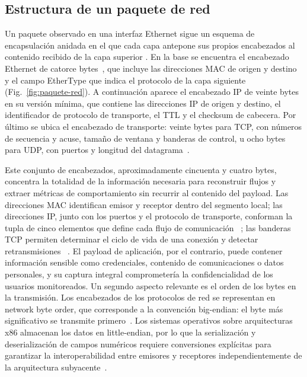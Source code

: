 \subsection{Estructura de un paquete de red
}

Un paquete observado en una interfaz Ethernet sigue un esquema de 
encapsulación anidada en el que cada capa antepone sus propios 
encabezados al contenido recibido de la capa superior 
\cite{forouzan2006transmision}. En la base se encuentra el encabezado 
Ethernet de catorce bytes~\cite{ieee8023}, que incluye las 
direcciones MAC de origen y destino y el campo EtherType que indica 
el protocolo de la capa siguiente (Fig.~\ref{fig:paquete-red}). A 
continuación aparece el encabezado IP de veinte bytes en su versión 
mínima, que contiene las direcciones IP de origen y destino, el 
identificador de protocolo de transporte, el TTL y el checksum de 
cabecera. Por último se ubica el encabezado de transporte: veinte 
bytes para TCP, con números de secuencia y acuse, tamaño de ventana 
y banderas de control, u ocho bytes para UDP, con puertos y longitud 
del datagrama~\cite{stevens2004unix}.

Este conjunto de encabezados, aproximadamente cincuenta y cuatro 
bytes, concentra la totalidad de la información necesaria para 
reconstruir flujos y extraer métricas de comportamiento sin recurrir 
al contenido del payload. Las direcciones MAC identifican emisor y 
receptor dentro del segmento local; las direcciones IP, junto con 
los puertos y el protocolo de transporte, conforman la tupla de 
cinco elementos que define cada flujo de comunicación 
~\cite{kurose2010redes}; las banderas TCP permiten determinar el 
ciclo de vida de una conexión y detectar retransmisiones 
~\cite{rfc793}. El payload de aplicación, por el contrario, puede 
contener información sensible como credenciales, contenido de 
comunicaciones o datos personales, y su captura integral 
comprometería la confidencialidad de los usuarios monitoreados.
Un segundo aspecto relevante es el orden de los bytes en la 
transmisión. Los encabezados de los protocolos de red se representan 
en network byte order, que corresponde a la convención big-endian: 
el byte más significativo se transmite primero~\cite{rfc793}. Los 
sistemas operativos sobre arquitecturas x86 almacenan los datos en 
little-endian, por lo que la serialización y deserialización de 
campos numéricos requiere conversiones explícitas para garantizar la 
interoperabilidad entre emisores y receptores independientemente de 
la arquitectura subyacente~\cite{stevens2004unix}.



